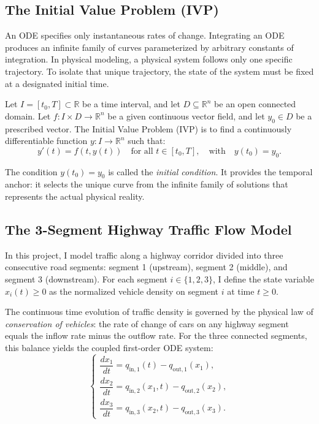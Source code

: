 \documentclass[runningheads]{llncs}
\begin{document}
\subsection{The Initial Value Problem (IVP)}
An ODE specifies only instantaneous rates of change. Integrating an ODE produces an infinite family of curves parameterized by arbitrary constants of integration. In physical modeling, a physical system follows only one specific trajectory. To isolate that unique trajectory, the state of the system must be fixed at a designated initial time.

\begin{definition}
Let $I = [t_0, T] \subset \mathbb{R}$ be a time interval, and let $D \subseteq \mathbb{R}^n$ be an open connected domain. Let $f : I \times D \to \mathbb{R}^n$ be a given continuous vector field, and let $y_0 \in D$ be a prescribed vector. The Initial Value Problem (IVP) is to find a continuously differentiable function $y : I \to \mathbb{R}^n$ such that:
\begin{equation}
\label{eq:ivp_def}
y'(t) = f(t, y(t)) \quad \text{for all } t \in [t_0, T], \quad \text{with} \quad y(t_0) = y_0.
\end{equation}
\end{definition}

The condition $y(t_0) = y_0$ is called the \emph{initial condition}. It provides the temporal anchor: it selects the unique curve from the infinite family of solutions that represents the actual physical reality.

\subsection{The 3-Segment Highway Traffic Flow Model}
In this project, I model traffic along a highway corridor divided into three consecutive road segments: segment 1 (upstream), segment 2 (middle), and segment 3 (downstream). For each segment $i \in \{1, 2, 3\}$, I define the state variable $x_i(t) \ge 0$ as the normalized vehicle density on segment $i$ at time $t \ge 0$.

The continuous time evolution of traffic density is governed by the physical law of \emph{conservation of vehicles}: the rate of change of cars on any highway segment equals the inflow rate minus the outflow rate. For the three connected segments, this balance yields the coupled first-order ODE system:
\begin{equation}
\label{eq:traffic_system}
\begin{cases}
\dfrac{dx_1}{dt} = q_{\text{in}, 1}(t) - q_{\text{out}, 1}(x_1), \\[6pt]
\dfrac{dx_2}{dt} = q_{\text{in}, 2}(x_1, t) - q_{\text{out}, 2}(x_2), \\[6pt]
\dfrac{dx_3}{dt} = q_{\text{in}, 3}(x_2, t) - q_{\text{out}, 3}(x_3).
\end{cases}
\end{equation}
\end{document}
